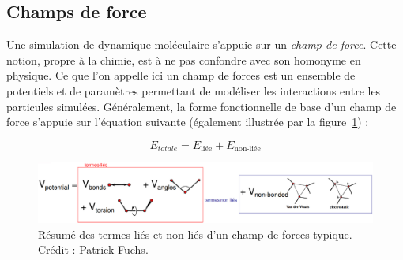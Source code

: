 \begin{appendices}
	\subsection{Champs de force}
	\label{sub:forceField}
	Une simulation de dynamique moléculaire s'appuie sur un \emph{champ de force}. Cette notion, propre à la chimie, est à ne pas confondre avec son homonyme en physique. Ce que l'on appelle ici un champ de forces est un ensemble de potentiels et de paramètres permettant de modéliser les interactions entre les particules simulées. Généralement, la forme fonctionnelle de base d'un champ de force s'appuie sur l'équation suivante (également illustrée par la figure~\ref{fig:ffterms}) :
	
	\begin{equation}
		\label{eq:forcefield}
		E_{totale} = E_\text{liée} + E_\text{non-liée}
	\end{equation}
	
	\begin{figure}[!htbp]
		\centering
		\includegraphics[width=\textwidth]{figures/ch1/ffterms}
		\caption[Termes d'un champ de forces]{Résumé des termes liés et non liés d'un champ de forces typique. Crédit : Patrick Fuchs\footnotemark.}
		\label{fig:ffterms}
	\end{figure}
	
	

\end{appendices}
